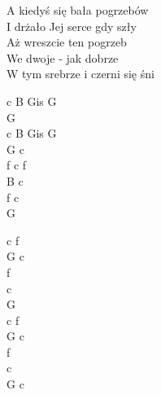 \begin{text}
    \vin A kiedyś się bała pogrzebów\\
    \vin I drżało Jej serce gdy szły\\
    \vin Aż wreszcie ten pogrzeb\\
    \vin We dwoje - jak dobrze\\
    \vin W tym srebrze i czerni się śni

\end{text}
\begin{chord}
    c B Gis G\\
    G\\
    c B Gis G\\
    G c\\
    f c f\\
    B c\\
    f c\\
    G

    c f\\
    G c\\
    f\\
    c\\
    G\\
    c f\\
    G c\\
    f\\
    c\\
    G c
\end{chord}
